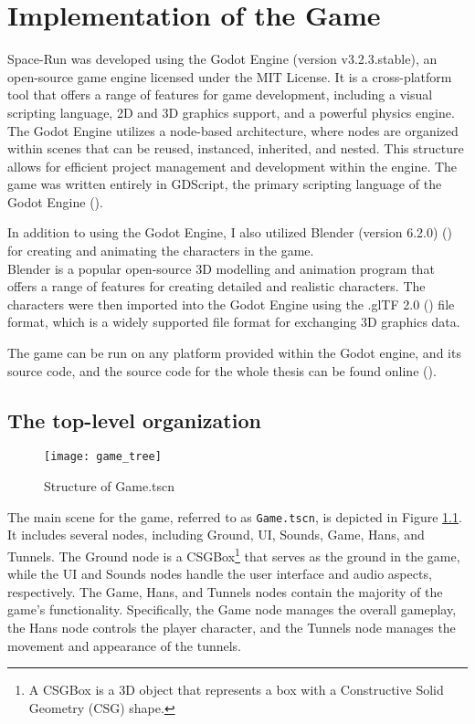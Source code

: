 \chapter{Implementation of the Game}
Space-Run was developed using the Godot Engine (version v3.2.3.stable), an open-source game engine licensed under the MIT License. It is a cross-platform tool that offers a range of features for game development, including a visual scripting language, 2D and 3D graphics support, and a powerful physics engine. The Godot Engine utilizes a node-based architecture, where nodes are organized within scenes that can be reused, instanced, inherited, and nested. This structure allows for efficient project management and development within the engine. The game was written entirely in GDScript, the primary scripting language of the Godot Engine (\cite{GodotDocs}).

In addition to using the Godot Engine, I also utilized Blender (version 6.2.0) (\cite{blender}) for creating and animating the characters in the game.\\ Blender is a popular open-source 3D modelling and animation program that offers a range of features for creating detailed and realistic characters. The characters were then imported into the Godot Engine using the .glTF 2.0 (\cite{gltf}) file format, which is a widely supported file format for exchanging 3D graphics data.

The game can be run on any platform provided within the Godot engine, and its source code, and the source code for the whole thesis can be found online (\cite{spacerunai}).

\section{The top-level organization}
\begin{figure}[h]
    \centering
    \texttt{[image: game\_tree]}
    \caption{Structure of Game.tscn}
    \label{fig:game_tree}
\end{figure}

The main scene for the game, referred to as \texttt{Game.tscn}, is depicted in Figure \ref{fig:game_tree}. It includes several nodes, including Ground, UI, Sounds, Game, Hans, and Tunnels. The Ground node is a CSGBox\footnote{A CSGBox is a 3D object that represents a box with a Constructive Solid Geometry (CSG) shape.} that serves as the ground in the game, while the UI and Sounds nodes handle the user interface and audio aspects, respectively. The Game, Hans, and Tunnels nodes contain the majority of the game's functionality. Specifically, the Game node manages the overall gameplay, the Hans node controls the player character, and the Tunnels node manages the movement and appearance of the tunnels.

